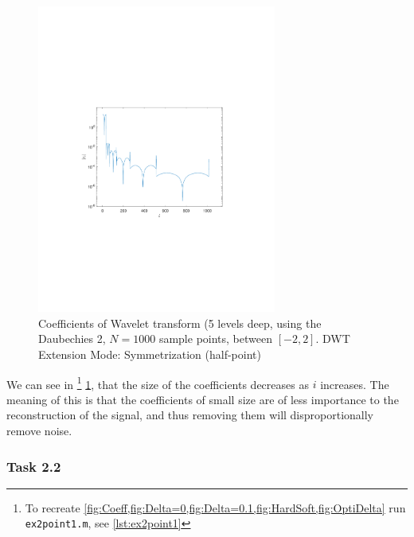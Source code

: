 \documentclass[a4paper]{article}
\begin{document}
    \begin{figure}[H]
	\centering
	\includegraphics[trim={3.5cm 8cm 4cm 9cm},clip,width=0.7\textwidth]{Images/Coefficents.pdf}
	\caption{Coefficients of Wavelet transform (5 levels deep, using the Daubechies 2, $N=1000$ sample points, between $[-2,2]$. DWT Extension Mode: Symmetrization (half-point)}
	\label{fig:Coeff}
    \end{figure}

    We can see in \footnote{To recreate \cref{fig:Coeff,fig:Delta=0,fig:Delta=0.1,fig:HardSoft,fig:OptiDelta} run \texttt{ex2point1.m}, see \cref{lst:ex2point1}} \cref{fig:Coeff}, that the size of the coefficients decreases as $i$ increases. The meaning of this is that the coefficients of small size are of less importance to the reconstruction of the signal, and thus removing them will disproportionally remove noise.

    \subsubsection{Task 2.2} \label{subsubsec:thresholding}
\end{document}
